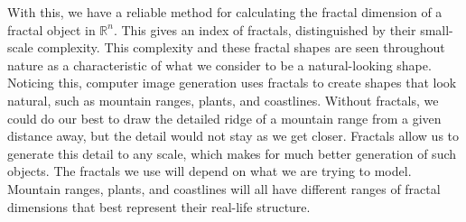 With this, we have a reliable method for calculating the fractal dimension of a fractal object in $\mathbb{R}^n$. This gives an index of fractals, distinguished by their small-scale complexity. 
This complexity and these fractal shapes are seen throughout nature as a characteristic of what we consider to be a natural-looking shape. Noticing this, computer image generation uses fractals to create shapes that look natural, such as mountain ranges, plants, and coastlines. Without fractals, we could do our best to draw the detailed ridge of a mountain range from a given distance away, but the detail would not stay as we get closer. Fractals allow us to generate this detail to any scale, which makes for much better generation of such objects. The fractals we use will depend on what we are trying to model. Mountain ranges, plants, and coastlines will all have different ranges of fractal dimensions that best represent their real-life structure. 


